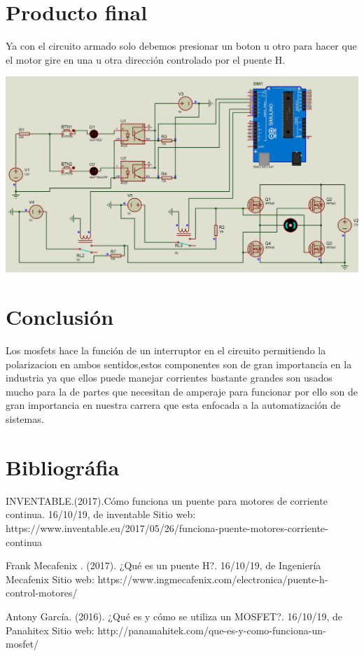 \documentclass[12pt,a4paper]{article}
\begin{document}
\newpage
\begin{flushleft}
\section{Producto final}
Ya con el circuito armado solo debemos presionar un boton u otro para hacer que el motor gire en una u otra dirección controlado por el puente H.\linebreak

\includegraphics[scale=0.2]{imagenes/simu0.JPG}\linebreak

\section{Conclusión}
Los mosfets hace la función de un interruptor en el circuito permitiendo la polarizacion en ambos sentidos,estos componentes son de gran importancia en la industria ya que ellos puede manejar corrientes bastante grandes son usados mucho para la  de partes que necesitan  de amperaje para funcionar por ello son de gran importancia en nuestra carrera que esta enfocada a la automatización de sistemas.

\section{Bibliográfia}
INVENTABLE.(2017).Cómo funciona un puente para motores de corriente continua. 16/10/19, de inventable Sitio web: https://www.inventable.eu/2017/05/26/funciona-puente-motores-corriente-continua\linebreak

Frank Mecafenix . (2017). ¿Qué es un puente H?. 16/10/19, de Ingeniería Mecafenix Sitio web: https://www.ingmecafenix.com/electronica/puente-h-control-motores/\linebreak

Antony García. (2016). ¿Qué es y cómo se utiliza un MOSFET?. 16/10/19, de Panahitex Sitio web: http://panamahitek.com/que-es-y-como-funciona-un-mosfet/\linebreak

\end{flushleft}
\end{document}
